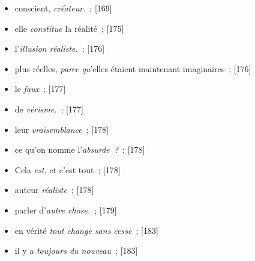\documentclass[12pt, a4paper]{article}
\begin{document}
\begin{itemize}
    \item conscient, \textit{créateur.}{\color{gray}~; [169]}

    \item elle \textit{constitue} la réalité{\color{gray}~; [175]}

    \item l’\textit{illusion réaliste.}{\color{gray}~; [176]}

    \item plus réelles, \textit{parce qu}’elles étaient maintenant imaginaires{\color{gray}~; [176]}

    \item le \textit{faux}{\color{gray}~; [177]}

    \item de \textit{vérisme.}{\color{gray}~; [177]}

    \item leur \textit{vraisemblance}{\color{gray}~; [178]}

    \item ce qu’on nomme l’\textit{absurde~?}{\color{gray}~; [178]}

    \item Cela \textit{est,} et c’est tout{\color{gray}~; [178]}

    \item auteur \textit{réaliste}{\color{gray}~; [178]}

    \item parler d’\textit{autre chose.}{\color{gray}~; [179]}

    \item en vérité \textit{tout change sans cesse}{\color{gray}~; [183]}

    \item il y a \textit{toujours du nouveau}{\color{gray}~; [183]}
\end{itemize}
\newpage
\tableofcontents
\end{document}
